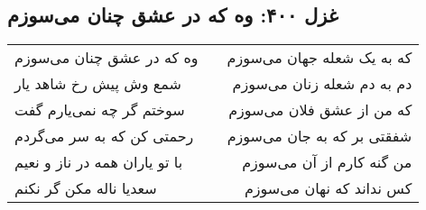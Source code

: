 \begin{center}
\section*{غزل ۴۰۰: وه که در عشق چنان می‌سوزم}
\label{sec:400}
\begin{longtable}{l p{0.5cm} r}
وه که در عشق چنان می‌سوزم
&&
که به یک شعله جهان می‌سوزم
\\
شمع وش پیش رخ شاهد یار
&&
دم به دم شعله زنان می‌سوزم
\\
سوختم گر چه نمی‌یارم گفت
&&
که من از عشق فلان می‌سوزم
\\
رحمتی کن که به سر می‌گردم
&&
شفقتی بر که به جان می‌سوزم
\\
با تو یاران همه در ناز و نعیم
&&
من گنه کارم از آن می‌سوزم
\\
سعدیا ناله مکن گر نکنم
&&
کس نداند که نهان می‌سوزم
\\
\end{longtable}
\end{center}
